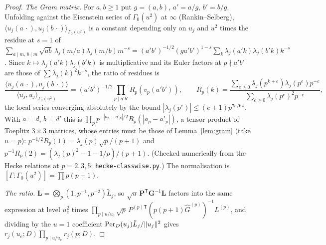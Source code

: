 \documentclass[11pt,a4paper]{article}
\theoremstyle{remark}\newtheorem{remark}[theorem]{Remark}
\begin{document}
\begin{proof}
\emph{The Gram matrix.} For $a,b\ge1$ put $g=(a,b)$, $a'=a/g$, $b'=b/g$. Unfolding against the Eisenstein series of
$\Gamma_0(u^2)$ at $\infty$ (Rankin--Selberg), $\langle u_j(a\,\cdot),u_j(b\,\cdot)\rangle_{\Gamma_0(u^2)}$ is a constant depending
only on $u_j$ and $u^2$ times the residue at $s=1$ of $\sum_{a\mid m,\,b\mid m}\sqrt{ab}\,\lambda_j(m/a)\lambda_j(m/b)m^{-s}
=(a'b')^{-1/2}(ga'b')^{1-s}\sum_k\lambda_j(a'k)\lambda_j(b'k)k^{-s}$. Since $k\mapsto\lambda_j(a'k)\lambda_j(b'k)$ is multiplicative
and its Euler factors at $p\nmid a'b'$ are those of $\sum\lambda_j(k)^2k^{-s}$, the ratio of residues is
\[
\frac{\langle u_j(a\,\cdot),u_j(b\,\cdot)\rangle}{\langle u_j,u_j\rangle_{\Gamma_0(u^2)}}=(a'b')^{-1/2}\prod_{p\mid a'b'}R_p(v_p(a'b')),\qquad
R_p(k)=\frac{\sum_{e\ge0}\lambda_j(p^{k+e})\lambda_j(p^e)p^{-e}}{\sum_{e\ge0}\lambda_j(p^e)^2p^{-e}},
\]
the local series converging absolutely by the bound $|\lambda_j(p^e)|\le(e+1)p^{7e/64}$. With $a=d$, $b=d'$ this is
$\prod_pp^{-|a_p-a'_p|/2}R_p(|a_p-a'_p|)$, a tensor product of Toeplitz $3\times3$ matrices, whose entries must be those of
Lemma~\ref{lem:gram} (take $u=p$): $p^{-1/2}R_p(1)=\lambda_j(p)\sqrt p/(p+1)$ and $p^{-1}R_p(2)=(\lambda_j(p)^2-1-1/p)/(p+1)$. (Checked
numerically from the Hecke relations at $p=2,3,5$; \texttt{hecke-classwise.py}.) The normalisation is $[\Gamma:\Gamma_0(u^2)]=\prod p(p+1)$.

\emph{The ratio.} $\mathbf L=\bigotimes_p(1,p^{-1},p^{-2})\tilde L_j$, so $\sqrt u\,\mathbf P^{\mathsf T}\mathbf G^{-1}\mathbf L$ factors
into the same expression at level $u_e^2$ times $\prod_{p\mid u/u_e}\sqrt p\,P^{(p)\mathsf T}(p(p+1)\hat G^{(p)})^{-1}L^{(p)}$, and dividing by the
$u=1$ coefficient $\mathrm{Per}_D(u_j)\tilde L_j/\|u_j\|^2$ gives $r_j(u_e;D)\prod_{p\mid u/u_e}r_j(p;D)$.
\end{proof}
\end{document}
